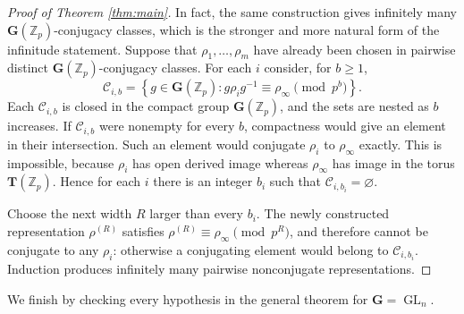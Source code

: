 \documentclass[11pt]{amsart}
\numberwithin{equation}{section}
\newcommand{\Zp}{\mathbb Z_p}
\newcommand{\GG}{\mathbf G}
\newcommand{\TT}{\mathbf T}
\newcommand{\GL}{\operatorname{GL}}
\theoremstyle{definition}
\begin{document}
\begin{proof}[Proof of Theorem \ref{thm:main}]
In fact, the same construction gives infinitely many
$\GG(\Zp)$-conjugacy classes, which is the stronger and more natural
form of the infinitude statement.  Suppose that
$\rho_1,\ldots,\rho_m$ have already been chosen in pairwise distinct
$\GG(\Zp)$-conjugacy classes.  For each $i$ consider, for $b\ge1$,
\[
 \mathcal C_{i,b}
 =\left\{g\in\GG(\Zp):
    g\rho_i g^{-1}\equiv\rho_\infty\pmod{p^b}
  \right\}.
\]
Each $\mathcal C_{i,b}$ is closed in the compact group
$\GG(\Zp)$, and the sets are nested as $b$ increases.  If
$\mathcal C_{i,b}$ were nonempty for every $b$, compactness would give
an element in their intersection.  Such an element would conjugate
$\rho_i$ to $\rho_\infty$ exactly.  This is impossible, because
$\rho_i$ has open derived image whereas $\rho_\infty$ has image in
the torus $\TT(\Zp)$.  Hence for each $i$ there is an integer $b_i$
such that $\mathcal C_{i,b_i}=\varnothing$.

Choose the next width $R$ larger than every $b_i$.  The newly
constructed representation $\rho^{(R)}$ satisfies
$\rho^{(R)}\equiv\rho_\infty\pmod{p^R}$, and therefore cannot be
conjugate to any $\rho_i$: otherwise a conjugating element would
belong to $\mathcal C_{i,b_i}$.  Induction produces infinitely many
pairwise nonconjugate representations.
\end{proof}


We finish by checking every hypothesis in the general theorem for
$\GG=\GL_n$. 
\end{document}

